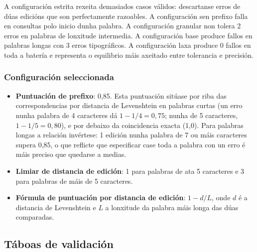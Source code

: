 \documentclass[%
    a4paper,               %
    twoside,               %
    10pt,                  %
]{article}                 %
\begin{document}
A configuración estrita rexeita demasiados casos válidos: descartanse erros de dúas edicións que son perfectamente razoables. A configuración sen prefixo falla en consultas polo inicio dunha palabra. A configuración granular non tolera 2 erros en palabras de lonxitude intermedia. A configuración base produce fallos en palabras longas con 3 erros tipográficos. A configuración laxa produce 0 fallos en toda a batería e representa o equilibrio máis axeitado entre tolerancia e precisión.

\subsubsection{Configuración seleccionada}

\begin{itemize}
    \item \textbf{Puntuación de prefixo}: 0,85. Esta puntuación sitúase por riba das correspondencias por distancia de Levenshtein en palabras curtas (un erro nunha palabra de 4 caracteres dá $1 - 1/4 = 0{,}75$; nunha de 5 caracteres, $1 - 1/5 = 0{,}80$), e por debaixo da coincidencia exacta (1,0). Para palabras longas a relación invértese: 1 edición nunha palabra de 7 ou máis caracteres supera 0,85, o que reflicte que especificar case toda a palabra con un erro é máis preciso que quedarse a medias.
    \item \textbf{Limiar de distancia de edición}: 1 para palabras de ata 5 caracteres e 3 para palabras de máis de 5 caracteres.
    \item \textbf{Fórmula de puntuación por distancia de edición}: $1 - d/L$, onde $d$ é a distancia de Levenshtein e $L$ a lonxitude da palabra máis longa das dúas comparadas.
\end{itemize}

\subsection{Táboas de validación}
\label{anx:validacion}
\end{document}

